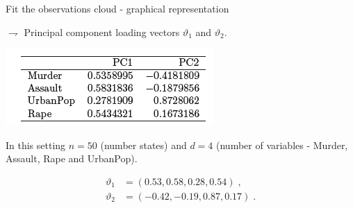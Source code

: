 \documentclass[9pt]{beamer}
\newcommand{\eqsp}{\;}
\begin{document}
\begin{frame}{Fit the observations cloud - graphical representation}

{\small $\rightharpoondown$ Principal component \textcolor{lighto}{loading vectors $\vartheta_1$ and $\vartheta_2$}.}

\vspace{.1cm}

\begin{center}
\includegraphics[scale=0.75]{usarrests_pc} 
\end{center}

In this setting \textcolor{lighto}{$n = 50$} (number states) and \textcolor{lighto}{$d = 4$} (number of variables - Murder, Assault, Rape and UrbanPop).

\begin{align*}
\vartheta_1 &= (0.53,0.58,0.28,0.54)\eqsp,\\
\vartheta_2 &= (-0.42,-0.19,0.87,0.17)\eqsp.
\end{align*}

%
%

\end{frame}
\end{document}
